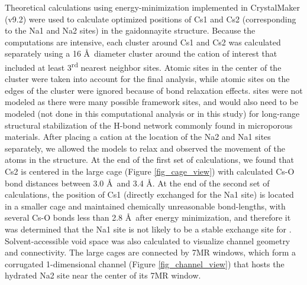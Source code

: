 \documentclass[journal=acsodf,manuscript=article]{achemso}
\begin{document}
Theoretical calculations using energy-minimization implemented in
CrystalMaker (v9.2) were used to calculate optimized positions of Cs1
and Cs2 (corresponding to the Na1 and Na2 sites) in the gaidonnayite structure.  Because the computations are intensive, each cluster around Cs1 and Cs2 was calculated separately using a 16 \AA\ diameter cluster around the cation of interest that included at least 3\textsuperscript{rd} nearest neighbor sites.  Atomic sites in the center of the cluster were taken into account for the final
analysis, while atomic sites on the edges of the cluster were ignored
because of bond relaxation effects.   sites were not modeled as there
were many possible framework  sites, and
 would also need to be modeled (not done in this
computational analysis or in this study) for long-range structural stabilization of the H-bond network commonly found in microporous materials.  After placing
a  cation at the location of the Na2 and Na1 sites separately,
we allowed the models to relax and observed the movement of the
 atoms in the structure.  At the end of the first set of calculations, we found that Cs2 is centered in the large cage (Figure {\ref{fig_cage_view}}) with calculated Cs-O bond distances between 3.0 \AA\ and 3.4 \AA. At the end of the second set of calculations, the position of Cs1 (directly
exchanged for the Na1 site) is located in a smaller cage and maintained
chemically unreasonable bond-lengths, with several Cs-O bonds less than 2.8 \AA\ after energy minimization, and therefore it was determined that the Na1 site
is not likely to be a stable exchange site for .  
Solvent-accessible void space was also calculated to visualize channel
geometry and connectivity.  The large cages are connected by 7MR
windows, which form a corrugated 1-dimensional channel
(Figure {\ref{fig_channel_view}}) that hosts the hydrated Na2
site near the center of its 7MR window.  
\end{document}
